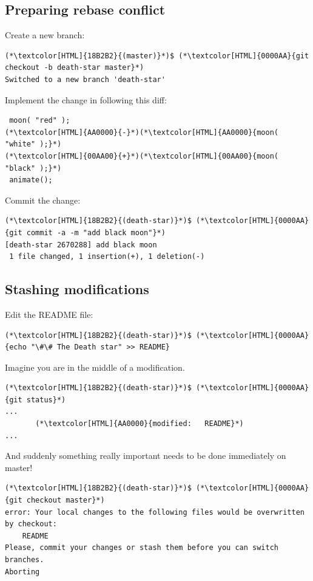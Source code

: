 \subsection{Preparing rebase conflict}
\begin{frame}[fragile]
  \subslidetitle

  Create a new  branch:
  \begin{lstlisting}
(*\textcolor[HTML]{18B2B2}{(master)}*)$ (*\textcolor[HTML]{0000AA}{git checkout -b death-star master}*)
Switched to a new branch 'death-star'
\end{lstlisting}

  Implement the change in  following this diff:

  \begin{lstlisting}
 moon( "red" );
(*\textcolor[HTML]{AA0000}{-}*)(*\textcolor[HTML]{AA0000}{moon( "white" );}*)
(*\textcolor[HTML]{00AA00}{+}*)(*\textcolor[HTML]{00AA00}{moon( "black" );}*)
 animate();
\end{lstlisting}

  Commit the change:
  \begin{lstlisting}
(*\textcolor[HTML]{18B2B2}{(death-star)}*)$ (*\textcolor[HTML]{0000AA}{git commit -a -m "add black moon"}*)
[death-star 2670288] add black moon
 1 file changed, 1 insertion(+), 1 deletion(-)
\end{lstlisting}
\end{frame}

\subsection{Stashing modifications}
\begin{frame}[fragile]
  \subslidetitle

  Edit the README file:
  \begin{lstlisting}
(*\textcolor[HTML]{18B2B2}{(death-star)}*)$ (*\textcolor[HTML]{0000AA}{echo "\#\# The Death star" >> README}
\end{lstlisting}

  Imagine you are in the middle of a modification.

  \begin{lstlisting}
(*\textcolor[HTML]{18B2B2}{(death-star)}*)$ (*\textcolor[HTML]{0000AA}{git status}*)
...
       (*\textcolor[HTML]{AA0000}{modified:   README}*)
...
\end{lstlisting}

  And suddenly something really important needs to be done immediately on master!

  \begin{lstlisting}
(*\textcolor[HTML]{18B2B2}{(death-star)}*)$ (*\textcolor[HTML]{0000AA}{git checkout master}*)
error: Your local changes to the following files would be overwritten by checkout:
	README
Please, commit your changes or stash them before you can switch branches.
Aborting
\end{lstlisting}
\end{frame}

